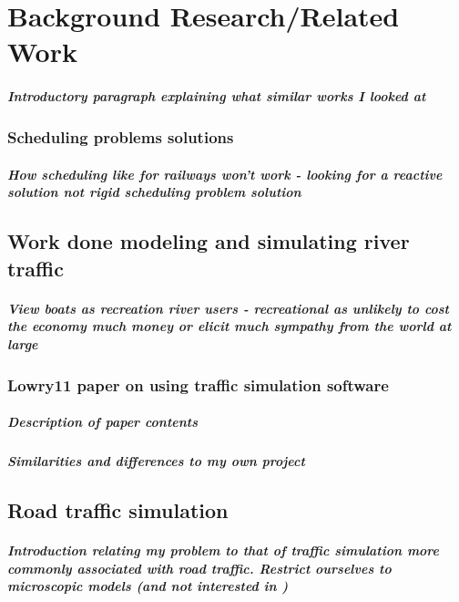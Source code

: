 \chapter{Background Research/Related Work}\label{chapter:background}
  \paragraph{Introductory paragraph explaining what similar works I looked at}
  

  \subsection{Scheduling problems solutions}
    \paragraph{How scheduling like for railways won't work - looking for a reactive solution not rigid scheduling problem solution}

  \section{Work done modeling and simulating river traffic}
    \paragraph{View boats as recreation river users - recreational as unlikely to cost the economy much money or elicit much sympathy from the world at large}

    \subsection{Lowry11 paper on using traffic simulation software}
      \paragraph{Description of paper contents}
      \paragraph{Similarities and differences to my own project}
      
  \section{Road traffic simulation}
      \paragraph{Introduction relating my problem to that of traffic simulation more commonly associated with road traffic. Restrict ourselves to microscopic models (and not interested in )}
